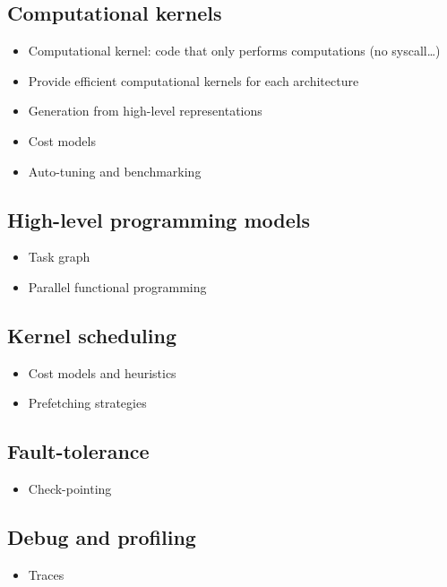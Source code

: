 \documentclass[DIV=calc, paper=a4, fontsize=11pt, twocolumn]{scrartcl}	 %
\begin{document}
\subsection{Computational kernels}

\begin{itemize}
   \item Computational kernel: code that only performs computations (no
   syscall\ldots)
   \item Provide efficient computational kernels for each architecture
   \item Generation from high-level representations
   \item Cost models
   \item Auto-tuning and benchmarking
\end{itemize}

\subsection{High-level programming models}

\begin{itemize}
   \item Task graph
   \item Parallel functional programming
\end{itemize}

\subsection{Kernel scheduling}

\begin{itemize}
   \item Cost models and heuristics
   \item Prefetching strategies
\end{itemize}

\subsection{Fault-tolerance}

\begin{itemize}
   \item Check-pointing
\end{itemize}

\subsection{Debug and profiling}

\begin{itemize}
   \item Traces
\end{itemize}
\end{document}
